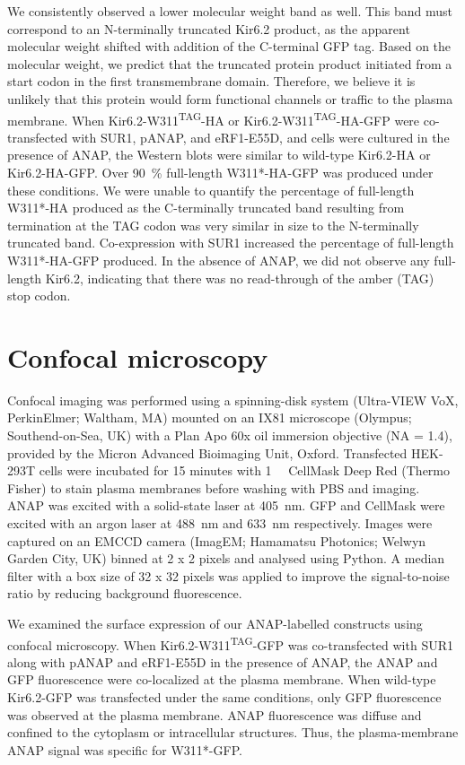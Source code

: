 We consistently observed a lower molecular weight band as well.
This band must correspond to an N-terminally truncated Kir6.2 product, as the apparent molecular weight shifted with addition of the C-terminal GFP tag.
Based on the molecular weight, we predict that the truncated protein product initiated from a start codon in the first transmembrane domain.
Therefore, we believe it is unlikely that this protein would form functional channels or traffic to the plasma membrane.
When Kir6.2-W311\textsuperscript{TAG}-HA or Kir6.2-W311\textsuperscript{TAG}-HA-GFP were co-transfected with SUR1, pANAP, and eRF1-E55D, and cells were cultured in the presence of ANAP, the Western blots were similar to wild-type Kir6.2-HA or Kir6.2-HA-GFP.
Over \SI{90}{\percent} full-length W311*-HA-GFP was produced under these conditions.
We were unable to quantify the percentage of full-length W311*-HA produced as the C-terminally truncated band resulting from termination at the TAG codon was very similar in size to the N-terminally truncated band.
Co-expression with SUR1 increased the percentage of full-length W311*-HA-GFP produced.
In the absence of ANAP, we did not observe any full-length Kir6.2, indicating that there was no read-through of the amber (TAG) stop codon.

\section{Confocal microscopy}
Confocal imaging was performed using a spinning-disk system (Ultra-VIEW VoX, PerkinElmer; Waltham, MA) mounted on an IX81 microscope (Olympus; Southend-on-Sea, UK) with a Plan Apo 60x oil immersion objective (NA = 1.4), provided by the Micron Advanced Bioimaging Unit, Oxford.
Transfected HEK-293T cells were incubated for 15 minutes with \SI{1}{\nano\Molar} CellMask Deep Red (Thermo Fisher) to stain plasma membranes before washing with PBS and imaging.
ANAP was excited with a solid-state laser at \SI{405}{\nano\metre}.
GFP and CellMask were excited with an argon laser at \SI{488}{\nano\metre} and \SI{633}{\nano\metre} respectively.
Images were captured on an EMCCD camera (ImagEM; Hamamatsu Photonics; Welwyn Garden City, UK) binned at 2 x 2 pixels and analysed using Python.
A median filter with a box size of 32 x 32 pixels was applied to improve the signal-to-noise ratio by reducing background fluorescence.

We examined the surface expression of our ANAP-labelled constructs using confocal microscopy.
When Kir6.2-W311\textsuperscript{TAG}-GFP was co-transfected with SUR1 along with pANAP and eRF1-E55D in the presence of ANAP, the ANAP and GFP fluorescence were co-localized at the plasma membrane.
When wild-type Kir6.2-GFP was transfected under the same conditions, only GFP fluorescence was observed at the plasma membrane.
ANAP fluorescence was diffuse and confined to the cytoplasm or intracellular structures.
Thus, the plasma-membrane ANAP signal was specific for W311*-GFP.

